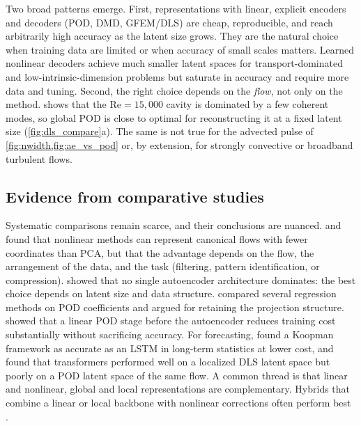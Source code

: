 Two broad patterns emerge. First, representations with linear, explicit
encoders and decoders (POD, DMD, GFEM/DLS) are cheap, reproducible, and reach
arbitrarily high accuracy as the latent size grows. They are the natural choice
when training data are limited or when accuracy of small scales matters.
Learned nonlinear decoders achieve much smaller latent spaces for
transport-dominated and low-intrinsic-dimension problems but saturate in
accuracy and require more data and tuning. Second, the right choice depends on
the \emph{flow}, not only on the method.  shows that the
$\mathrm{Re}=15{,}000$ cavity is dominated by a few coherent modes, so global
POD is close to optimal for reconstructing it at a fixed latent size
(\cref{fig:dls_compare}a). The same is not true for the advected pulse of
\cref{fig:nwidth,fig:ae_vs_pod} or, by extension, for strongly convective or
broadband turbulent flows.

\subsection{Evidence from comparative studies}

Systematic comparisons remain scarce, and their conclusions are nuanced.
\textcite{csala2022comparing} and \textcite{mendez2023linear} found that
nonlinear methods can represent canonical flows with fewer coordinates than
PCA, but that the advantage depends on the flow, the arrangement of the data,
and the task (filtering, pattern identification, or compression).
\textcite{gruber2022comparison} showed that no single autoencoder architecture
dominates: the best choice depends on latent size and data structure.
\textcite{swischuk2019projection} compared several regression methods on POD
coefficients and argued for retaining the projection structure.
\textcite{fresca2022poddlrom} showed that a linear POD stage before the
autoencoder reduces training cost substantially without sacrificing accuracy.
For forecasting, \textcite{eivazi2021koopman} found a Koopman framework as
accurate as an LSTM in long-term statistics at lower cost, and
\textcite{morton2026scitech} found that transformers performed well on a
localized DLS latent space but poorly on a POD latent space of the same flow.
A common thread is that linear and nonlinear, global and local
representations are complementary. Hybrids that combine a linear or local
backbone with nonlinear corrections often perform best
\parencite{linot2020inertial,fresca2022poddlrom,diaz2024ddnm}.


